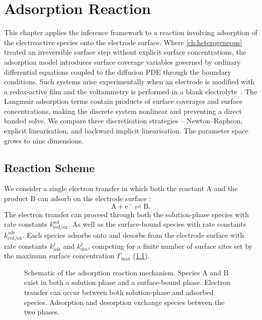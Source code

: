 \chapter{Adsorption Reaction}\label{ch:adsorption}

This chapter applies the inference framework to a reaction involving
adsorption of the electroactive species onto the electrode surface.
Where \cref{ch:heterogeneous} treated an irreversible surface step
without explicit surface concentrations, the adsorption model
introduces surface coverage variables governed by ordinary differential
equations coupled to the diffusion PDE through the boundary conditions.
Such systems arise experimentally when an electrode is modified with
a redox-active film and the voltammetry is performed in a blank
electrolyte~\cite{compton2014understanding}. The Langmuir adsorption
terms contain products of surface coverages and surface
concentrations, making the discrete system nonlinear and preventing a
direct banded solve. We compare three discretisation strategies --
Newton--Raphson, explicit linearisation, and backward implicit
linearisation. The parameter space grows to nine dimensions.

\section{Reaction Scheme}\label{sec:ads-scheme}

We consider a single electron transfer in which both the reactant
$\mathrm{A}$ and the product $\mathrm{B}$ can adsorb on the electrode
surface \cite{compton2014understanding}:
\begin{equation}\label{eq:ads-scheme}
  \mathrm{A} + \mathrm{e}^{-} \rightleftharpoons \mathrm{B}.
\end{equation}
The electron transfer can proceed through both the solution-phase
species with rate constants $k_{\mathrm{red/ox}}^{\mathrm{sol}}$.  As
well as the surface-bound species with rate constants
$k_{\mathrm{red/ox}}^{\mathrm{ads}}$. Each species adsorbs onto and
desorbs from the electrode surface with rate constants
$k_{\mathrm{ads}}^{j}$ and $k_{\mathrm{des}}^{j}$, competing for a
finite number of surface sites set by the maximum surface
concentration $\Gamma_{\mathrm{max}}$ (\cref{fig:ads-schematic}).

\begin{figure}
  \centering
  
  \caption[Schematic of the adsorption reaction]{Schematic of the
    adsorption reaction mechanism. Species $\mathrm{A}$ and $\mathrm{B}$
    exist in both a solution phase and a surface-bound phase.
    Electron transfer can occur between both solution-phase and
    adsorbed species. Adsorption and desorption exchange species between
  the two phases.}
  \label{fig:ads-schematic}
\end{figure}

